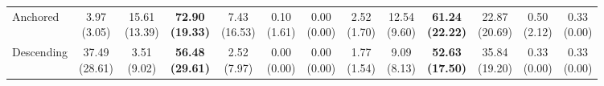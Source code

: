 {\begin{tabular}{l|cccccc|cccccc}
Anchored & \makecell{3.97 \\ (3.05)} & \makecell{15.61 \\ (13.39)} & {\cellcolor[HTML]{C8E6C9}} \bfseries \makecell{72.90 \\ (19.33)} & \makecell{7.43 \\ (16.53)} & \makecell{0.10 \\ (1.61)} & \makecell{0.00 \\ (0.00)} & \makecell{2.52 \\ (1.70)} & \makecell{12.54 \\ (9.60)} & {\cellcolor[HTML]{C8E6C9}} \bfseries \makecell{61.24 \\ (22.22)} & \makecell{22.87 \\ (20.69)} & \makecell{0.50 \\ (2.12)} & \makecell{0.33 \\ (0.00)} \\
Descending & \makecell{37.49 \\ (28.61)} & \makecell{3.51 \\ (9.02)} & {\cellcolor[HTML]{C8E6C9}} \bfseries \makecell{56.48 \\ (29.61)} & \makecell{2.52 \\ (7.97)} & \makecell{0.00 \\ (0.00)} & \makecell{0.00 \\ (0.00)} & \makecell{1.77 \\ (1.54)} & \makecell{9.09 \\ (8.13)} & {\cellcolor[HTML]{C8E6C9}} \bfseries \makecell{52.63 \\ (17.50)} & \makecell{35.84 \\ (19.20)} & \makecell{0.33 \\ (0.00)} & \makecell{0.33 \\ (0.00)} \\
\bottomrule
\end{tabular}
}%
